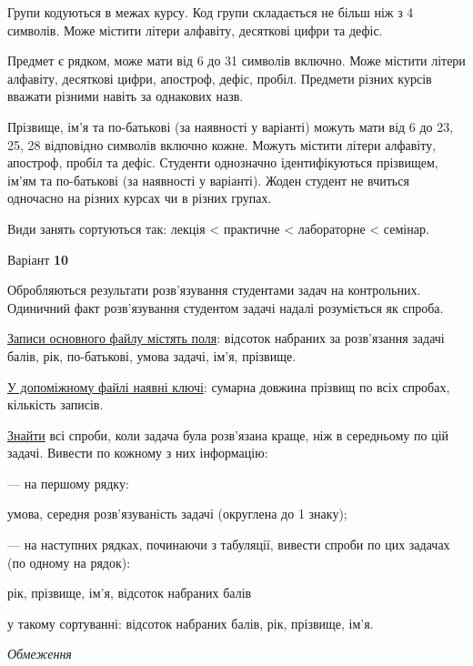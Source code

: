 \documentclass[11pt, ukrainian]{article}
\begin{document}
Групи кодуються в межах курсу.
Код групи складається не більш ніж з 4 символів.
Може містити літери алфавіту, десяткові цифри та дефіс.

Предмет є рядком, може мати від 6 до 31 символів включно.
Може містити літери алфавіту, десяткові цифри, апостроф, дефіс, пробіл.
Предмети різних курсів вважати різними навіть за однакових назв.

Прізвище, ім’я та по-батькові (за наявності у варіанті)
можуть мати від 6 до 23, 25, 28 відповідно символів включно кожне.
Можуть містити літери алфавіту, апостроф, пробіл та дефіс.
Студенти однозначно ідентифікуються прізвищем, ім’ям та по-батькові (за наявності у варіанті).
Жоден студент не вчиться одночасно на різних курсах чи в різних групах.

Види занять сортуються так: лекція < практичне < лабораторне < семінар.





\par
\newpage
{\center Варіант  \No \textbf { 10 }\par}
\bigskip
Обробляються результати розв’язування студентами задач на контрольних.
Одиничний факт роз\-в’я\-зу\-вання студентом задачі надалі розуміється як спроба.

\underline{Записи основного файлу містять поля}: відсоток набраних за розв’язання задачі балів, рік, по-бать\-ко\-ві, умова задачі, ім’я, прізвище.

\underline{У допоміжному файлі наявні ключі}: сумарна довжина прізвищ по всіх спробах, кількість записів.

\underline{Знайти} всі спроби, коли задача була розв’язана краще, ніж в середньому по цій задачі. Вивести по кожному з них інформацію:\par
{\noindent}--- на першому рядку:\par
умова, середня розв’язуваність задачі (округлена до 1 знаку);

{\noindent}--- на наступних рядках, починаючи з табуляції, вивести спроби по цих задачах (по одному на рядок):\par
рік, прізвище, ім’я, відсоток набраних балів

{\noindent}у такому сортуванні: відсоток набраних балів, рік, прізвище, ім’я.


\bigskip\textit{Обмеження}
\end{document}
